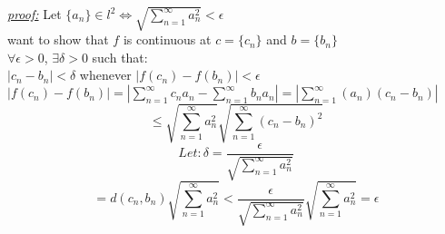 \documentclass{book}
\begin{document}



\begin{tcolorbox}[enhanced,attach boxed title to top center={yshift=-3mm,yshifttext=-1mm},
colback=blue!5!white,colframe=blue!75!black,colbacktitle=red!80!black,
title=Exercise 40.11:,fonttitle=\bfseries,
boxed title style={size=small,colframe=red!50!black} ]
\textit{\color{blue}\underline{proof:}}
Let $\{a_n\} \in l^2\iff \sqrt{\sum_{n=1}^{\infty} a_n ^2}<\epsilon$\\
want to show that $f$ is continuous at $c=\{c_n\}$ and $b=\{b_n\}$\\
$\forall\epsilon>0$, $\exists\delta>0$ such that:\\
$|c_n-b_n|<\delta$ whenever $|f(c_n)-f(b_n)|<\epsilon$\\
$|f(c_n)-f(b_n)|=|\sum_{n=1}^{\infty}c_n a_n-\sum_{n=1}^{\infty}b_n 
a_n|=|\sum_{n=1}^{\infty}(a_n)(c_n-b_n)|$\\
$$\leq\sqrt{\sum_{n=1}^{\infty}
a_n^2}\sqrt{\sum_{n=1}^{\infty}(c_n-b_n)^2}$$
{\color{red}$$Let:\delta=\frac{\epsilon}{\sqrt{\sum_{n=1}^{\infty}a_n^2}}$$}
$$=d(c_n,b_n)\sqrt{\sum_{n=1}^{\infty} 
a_n^2}<\frac{\epsilon}{\sqrt{\sum_{n=1}^{\infty} 
a_n^2}}\sqrt{\sum_{n=1}^{\infty} a_n^2}=\epsilon$$
\end{tcolorbox}
\end{document}
